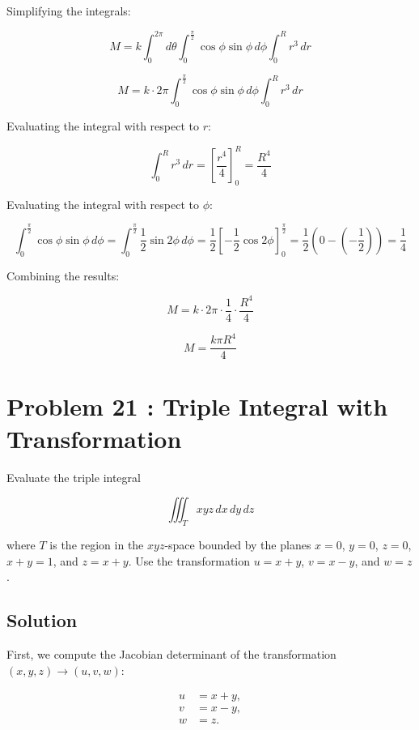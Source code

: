 \documentclass{article}
\begin{document}
Simplifying the integrals:


\[
M = k \int_{0}^{2\pi} d\theta \int_{0}^{\frac{\pi}{2}} \cos \phi \sin \phi \, d\phi \int_{0}^{R} r^3 \, dr
\]




\[
M = k \cdot 2\pi \int_{0}^{\frac{\pi}{2}} \cos \phi \sin \phi \, d\phi \int_{0}^{R} r^3 \, dr
\]



Evaluating the integral with respect to \( r \):


\[
\int_{0}^{R} r^3 \, dr = \left[ \frac{r^4}{4} \right]_{0}^{R} = \frac{R^4}{4}
\]



Evaluating the integral with respect to \( \phi \):


\[
\int_{0}^{\frac{\pi}{2}} \cos \phi \sin \phi \, d\phi = \int_{0}^{\frac{\pi}{2}} \frac{1}{2} \sin 2\phi \, d\phi = \frac{1}{2} \left[ -\frac{1}{2} \cos 2\phi \right]_{0}^{\frac{\pi}{2}} = \frac{1}{2} \left( 0 - (-\frac{1}{2}) \right) = \frac{1}{4}
\]



Combining the results:


\[
M = k \cdot 2\pi \cdot \frac{1}{4} \cdot \frac{R^4}{4}
\]




\[
M = \frac{k \pi R^4}{4}
\]


\section*{Problem 21 : Triple Integral with Transformation}
Evaluate the triple integral


\[
\iiint_{T} x y z \, dx \, dy \, dz
\]


where \( T \) is the region in the \( xyz \)-space bounded by the planes \( x = 0 \), \( y = 0 \), \( z = 0 \), \( x + y = 1 \), and \( z = x + y \). Use the transformation \( u = x + y \), \( v = x - y \), and \( w = z \).

\subsection*{Solution}
First, we compute the Jacobian determinant of the transformation \( (x, y, z) \rightarrow (u, v, w) \):



\[
\begin{aligned}
u &= x + y, \\
v &= x - y, \\
w &= z.
\end{aligned}
\]
\end{document}
